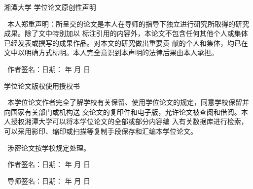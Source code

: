 ﻿%
\begin{center}
    {\heiti{}湘潭大学 \vskip5mm 学位论文原创性声明}
\end{center}
\songti{}

    ~本人郑重声明：所呈交的论文是本人在导师的指导下独立进行研究所取得的研究成果。除了文中特别加以
标注引用的内容外，本论文不包含任何其他个人或集体已经发表或撰写的成果作品。对本文的研究做出重要贡
献的个人和集体，均已在文中以明确方式标明。本人完全意识到本声明的法律后果由本人承担。
\vskip8mm

    ~作者签名：\hfill                          日期：\kern 1.6cm 年 \kern 0.8cm 月 \kern 0.8cm 日
\vskip30mm
\begin{center}
    {\heiti{}学位论文版权使用授权书}
\end{center}

    ~本学位论文作者完全了解学校有关保留、使用学位论文的规定，同意学校保留并向国家有关部门或机构送
交论文的复印件和电子版，允许论文被查阅和借阅。本人授权湘潭大学可以将本学位论文的全部或部分内容编
入有关数据库进行检索，可以采用影印、缩印或扫描等复制手段保存和汇编本学位论文。
\par
    ~涉密论文按学校规定处理。
\vskip30mm

    ~作者签名：\hfill                         日期：\kern 1.6cm 年 \kern 0.8cm 月 \kern 0.8cm 日
\vskip8mm

    ~导师签名：\hfill                         日期：\kern 1.6cm 年 \kern 0.8cm 月 \kern 0.8cm 日